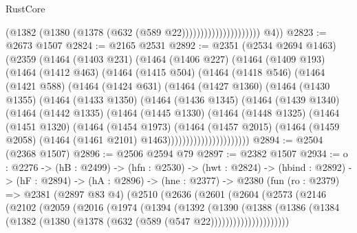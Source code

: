 \begin{lexlean}{RustCore}
\begin{coremodule}
                                        (@1382 (@1380 (@1378 (@632 (@589 @22)))))))))))))))))))))
        @4))
@2823 := @2673 @1507
@2824 := @2165 @2531
@2892 := @2351
    (@2534 @2694 @1463)
    (@2359
      (@1464
        (@1403 @231)
        (@1464
          (@1406 @227)
          (@1464
            (@1409 @193)
            (@1464
              (@1412 @463)
              (@1464
                (@1415 @504)
                (@1464
                  (@1418 @546)
                  (@1464
                    (@1421 @588)
                    (@1464
                      (@1424 @631)
                      (@1464
                        (@1427 @1360)
                        (@1464
                          (@1430 @1355)
                          (@1464
                            (@1433 @1350)
                            (@1464
                              (@1436 @1345)
                              (@1464
                                (@1439 @1340)
                                (@1464
                                  (@1442 @1335)
                                  (@1464
                                    (@1445 @1330)
                                    (@1464
                                      (@1448 @1325)
                                      (@1464
                                        (@1451 @1320)
                                        (@1464
                                          (@1454 @1973)
                                          (@1464
                                            (@1457 @2015)
                                            (@1464
                                              (@1459 @2058)
                                              (@1464 (@1461 @2101) @1463))))))))))))))))))))))
@2894 := @2504 (@2368 @1507)
@2896 := @2506 @2594 @79
@2897 := @2382 @1507
@2934 := {o : @2276} ->
  (hB : @2499) ->
  (hfn : @2530) ->
  (hwt : @2824) ->
  (hbind : @2892) ->
  (hF : @2894) ->
  (hA : @2896) ->
  (hne : @2377) ->
  @2380
    (fun (ro : @2379) =>
    @2381
      (@2897 @83 @4)
      (@2510
        (@2636
          (@2601
            (@2604
              (@2573
                (@2146
                  (@2102
                    (@2059
                      (@2016
                        (@1974
                          (@1394
                            (@1392
                              (@1390
                                (@1388
                                  (@1386
                                    (@1384
                                      (@1382
                                        (@1380 (@1378 (@632 (@589 (@547 @22)))))))))))))))))))))

\end{coremodule}
\end{lexlean}
